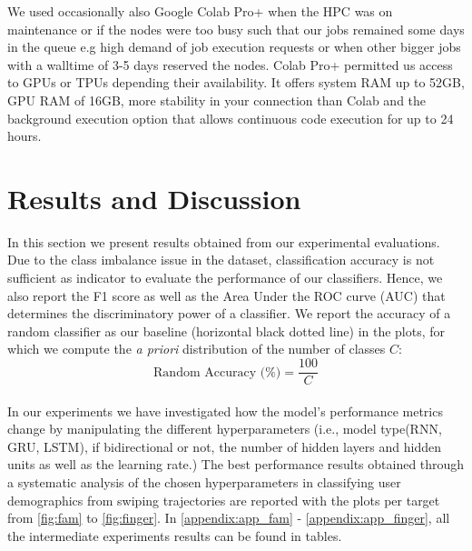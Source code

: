 \documentclass[11pt,oneside,a4paper,openright]{book}
\begin{document}
We used occasionally also Google Colab Pro+ when the HPC was on maintenance or if the nodes were too busy such that our jobs remained some days in the queue e.g high demand of job execution requests or when other bigger jobs with a walltime of 3-5 days reserved the nodes. Colab Pro+ permitted us access to GPUs or TPUs depending their availability. It offers system RAM up to 52GB, GPU RAM of 16GB, more stability in your connection than Colab and the background execution option that allows continuous code execution for up to 24 hours.\newpage



\chapter{Results and Discussion}



In this section we present results obtained from our experimental evaluations. Due to the class imbalance issue in the dataset, classification accuracy is not sufficient as indicator to evaluate the performance of our classifiers. Hence, we also report the F1 score as well as the Area Under the ROC curve (AUC) that determines the discriminatory power of a classifier. We report the accuracy of a random classifier as our baseline (horizontal black dotted line) in the plots, for which we compute the \emph{a priori} distribution of the number of classes $C$:
\begin{equation}
    \text{Random Accuracy (\%)} = \frac{100}{C}
\end{equation}\\

In our experiments we have investigated how the model's performance metrics change by manipulating the different hyperparameters (i.e., model type(RNN, GRU, LSTM), if bidirectional or not, the number of hidden layers and hidden units as well as the learning rate.) The best performance results obtained through a systematic analysis of the chosen hyperparameters in classifying user demographics from swiping trajectories  are reported  with the plots per target from \autoref{fig:fam} to \autoref{fig:finger}. In \autoref{appendix:app_fam} - \autoref{appendix:app_finger}, all the intermediate experiments results can be found in tables.\\
\end{document}

